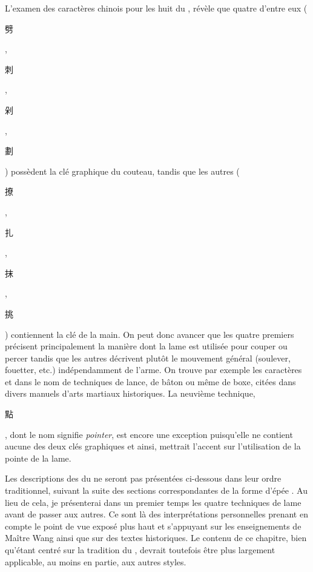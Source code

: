 L'examen des caractères chinois pour les huit \Jianfa{} du \Yangjia{} \Michuan{}, révèle que quatre d'entre eux (\Pi{} \begin{CJK*}{UTF8}{bsmi}劈\end{CJK*}, \Ci{} \begin{CJK*}{UTF8}{bsmi}刺\end{CJK*}, \Duo{} \begin{CJK*}{UTF8}{bsmi}剁\end{CJK*}, \Hua{} \begin{CJK*}{UTF8}{bsmi}劃\end{CJK*}) possèdent la clé graphique du couteau, tandis que les autres (\Liao{} \begin{CJK*}{UTF8}{bsmi}撩\end{CJK*}, \Zha{} \begin{CJK*}{UTF8}{bsmi}扎\end{CJK*}, \Mo{} \begin{CJK*}{UTF8}{bsmi}抹\end{CJK*}, \Tiao{} \begin{CJK*}{UTF8}{bsmi}挑\end{CJK*}) contiennent la clé de la main. On peut donc avancer que les quatre premiers précisent principalement la manière dont la lame est utilisée pour couper ou percer tandis que les autres décrivent plutôt le mouvement général (soulever, fouetter, etc.) indépendamment de l'arme. On trouve par exemple les caractères \Liao{} et \Zha{} dans le nom de techniques de lance, de bâton ou même de boxe, citées dans divers manuels d'arts martiaux historiques. La neuvième technique, \Dian{} \begin{CJK*}{UTF8}{bsmi}點\end{CJK*}, dont le nom signifie \textit{pointer}, est encore une exception puisqu'elle ne contient aucune des deux clés graphiques et ainsi, mettrait l'accent sur l'utilisation de la pointe de la lame.

Les descriptions des \Jiben{} \Jianfa{} du \Yangjia{} \Michuan{} \Taijijian{} ne seront pas présentées ci-dessous dans leur ordre traditionnel, suivant la suite des sections correspondantes de la forme d'épée \Kunlun{}. Au lieu de cela, je présenterai dans un premier temps les quatre techniques de lame avant de passer aux autres. Ce sont là des interprétations personnelles prenant en compte le point de vue exposé plus haut et s'appuyant sur les enseignements de Maître Wang ainsi que sur des textes historiques. Le contenu de ce chapitre, bien qu'étant centré sur la tradition du \Yangjia{} \Michuan{}, devrait toutefois être plus largement applicable, au moins en partie, aux autres styles.

